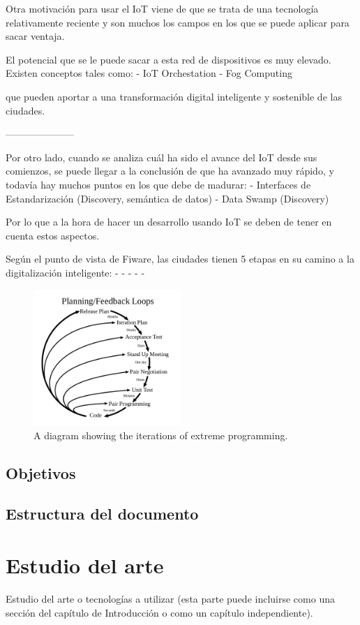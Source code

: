\documentclass[12pt, a4paper, twoside]{article}
\begin{document}
Otra motivación para usar el IoT viene de que se trata de  una tecnología relativamente reciente 
y son muchos los campos en los que se puede aplicar para sacar ventaja.

El potencial que se le puede sacar a esta red de dispositivos es muy elevado. Existen conceptos tales como:
 - IoT Orchestation
 - Fog Computing

que pueden aportar a una transformación digital inteligente y sostenible de las ciudades.


 ---------------------

Por otro lado, cuando se analiza cuál ha sido el avance del IoT desde sus comienzos,
se puede llegar a la conclusión de que ha avanzado muy rápido, y todavía hay muchos 
puntos en los que debe de madurar:
 - Interfaces de Estandarización (Discovery, semántica de datos)
 - Data Swamp (Discovery)

Por lo que a la hora de hacer un desarrollo usando IoT se deben de tener en cuenta estos aspectos.


 Según el punto de vista de Fiware, las ciudades tienen 5 etapas en su camino a la digitalización inteligente:
 -
 -
 -
 -
 -

    
    \begin{figure}[h]
      \centering
        \includegraphics[width=0.5\textwidth]{xp}
      \caption{A diagram showing the iterations of extreme programming.}
    \end{figure}
    
    \blindtext[4]
\subsection{Objetivos}
\subsection{Estructura del documento}

\section{Estudio del arte \\}
Estudio del arte o tecnologías a utilizar (esta parte puede incluirse como una sección del capítulo de Introducción o como un capítulo independiente).
\end{document}
